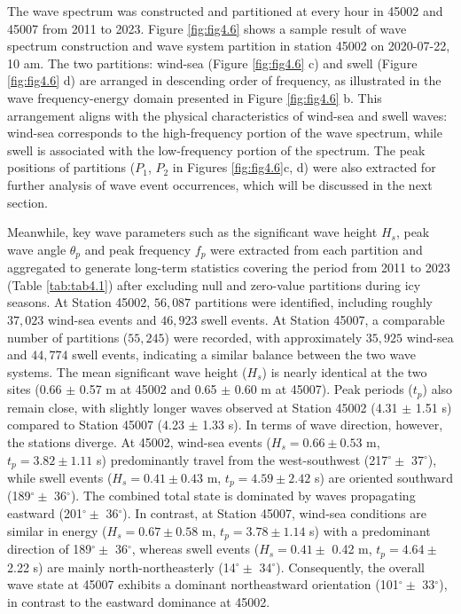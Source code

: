 The wave spectrum was constructed and partitioned at every hour in 45002 and
45007 from 2011 to 2023. Figure \ref{fig:fig4.6} shows a sample result of wave
spectrum construction and wave system partition in station 45002 on 2020-07-22,
10 am. The two partitions: wind-sea (Figure \ref{fig:fig4.6} c) and swell
(Figure \ref{fig:fig4.6} d) are arranged in descending order of frequency, as
illustrated in the wave frequency-energy domain presented in Figure
\ref{fig:fig4.6} b. This arrangement aligns with the physical characteristics of
wind-sea and swell waves: wind-sea corresponds to the high-frequency portion of
the wave spectrum, while swell is associated with the low-frequency portion of
the spectrum. The peak positions of partitions (\eg $P_1$, $P_2$ in Figures
\ref{fig:fig4.6}c, d) were also extracted for further analysis of wave event
occurrences, which will be discussed in the next section. 

Meanwhile, key wave parameters such as the significant wave height $H_s$, peak
wave angle $\theta_p$ and peak frequency $f_p$ were extracted from each
partition and aggregated to generate long-term statistics covering the period
from 2011 to 2023 (Table \ref{tab:tab4.1}) after excluding null and zero-value
partitions during icy seasons. At Station 45002, $56,087$ partitions were
identified, including roughly $37,023$ wind-sea events and $46,923$ swell
events. At Station 45007, a comparable number of partitions ($55,245$) were
recorded, with approximately $35,925$ wind-sea and $44,774$ swell events,
indicating a similar balance between the two wave systems. The mean significant
wave height ($H_s$) is nearly identical at the two sites (0.66 $\pm$ 0.57 m at
45002 and 0.65 $\pm$ 0.60 m at 45007). Peak periods ($t_p$) also remain close,
with slightly longer waves observed at Station 45002 (4.31 $\pm$ 1.51 s)
compared to Station 45007 (4.23 $\pm$ 1.33 s). In terms of wave direction,
however, the stations diverge. At 45002, wind-sea events ($H_s = 0.66 \pm 0.53$
m, $t_p = 3.82 \pm 1.11$ s) predominantly travel from the west-southwest
(217$^\circ \pm$ 37$^\circ$), while swell events ($H_s = 0.41 \pm 0.43$ m, $t_p
= 4.59 \pm 2.42$ s) are oriented southward (189$^\circ \pm$ 36$^\circ$). The
combined total state is dominated by waves propagating eastward (201$^\circ \pm$
36$^\circ$). In contrast, at Station 45007, wind-sea conditions are similar in
energy ($H_s = 0.67 \pm 0.58$ m, $t_p = 3.78 \pm 1.14$ s) with a predominant
direction of 189$^\circ \pm$ 36$^\circ$, whereas swell events ($H_s = 0.41 \pm$
0.42 m, $t_p = 4.64 \pm$ 2.22 s) are mainly north-northeasterly (14$^\circ \pm$
34$^\circ$). Consequently, the overall wave state at 45007 exhibits a dominant
northeastward orientation (101$^\circ \pm$ 33$^\circ$), in contrast to the
eastward dominance at 45002.

